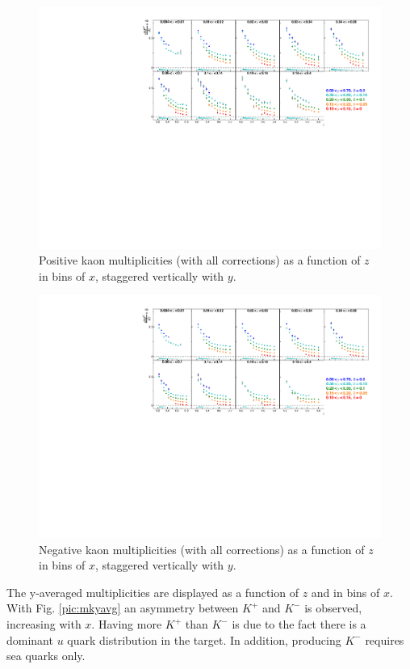 \begin{figure}[!h]
  \centering
	\includegraphics[scale=0.85]{./gfx/Kp.pdf}
	\caption{Positive kaon multiplicities (with all corrections) as a function of $z$ in bins of $x$, staggered vertically with $y$.}
	\label{pic:mkp}
\end{figure}

\begin{figure}[!h]
  \centering
	\includegraphics[scale=0.85]{./gfx/Km.pdf}
	\caption{Negative kaon multiplicities (with all corrections) as a function of $z$ in bins of $x$, staggered vertically with $y$.}
	\label{pic:mkm}
\end{figure}

The y-averaged multiplicities are displayed as a function of $z$ and in bins of $x$. With Fig. \ref{pic:mkyavg} an asymmetry between $K^+$ and $K^-$ is observed, increasing with $x$. Having more $K^+$ than $K^-$ is due to the fact there is a dominant $u$ quark distribution in the target. In addition, producing $K^-$ requires sea quarks only.


